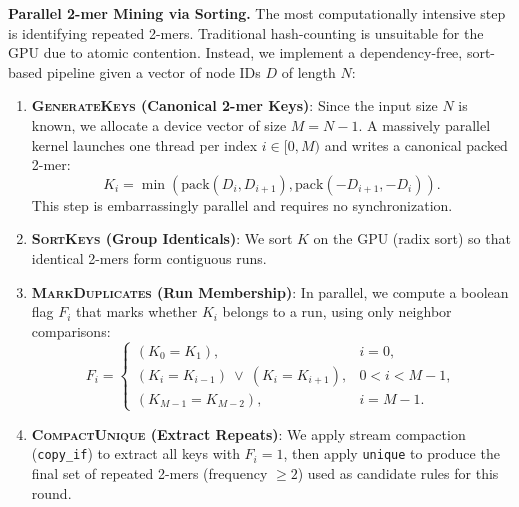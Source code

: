 \noindent \textbf{Parallel 2-mer Mining via Sorting.}
The most computationally intensive step is identifying repeated 2-mers. Traditional hash-counting is unsuitable for the GPU due to atomic contention. Instead, we implement a dependency-free, sort-based pipeline given a vector of node IDs $D$ of length $N$:
\begin{enumerate}[noitemsep, topsep=2pt, leftmargin=*]
  \item \textbf{\textsc{GenerateKeys} (Canonical 2-mer Keys)}: Since the input size $N$ is known, we allocate a device vector of size $M=N-1$. A massively parallel kernel launches one thread per index $i \in [0, M)$ and writes a canonical packed 2-mer:
        \[
          K_i = \min(\text{pack}(D_i, D_{i+1}), \text{pack}(-D_{i+1}, -D_i)).
        \]
        This step is embarrassingly parallel and requires no synchronization.
  \item \textbf{\textsc{SortKeys} (Group Identicals)}: We sort $K$ on the GPU (radix sort) so that identical 2-mers form contiguous runs.
  \item \textbf{\textsc{MarkDuplicates} (Run Membership)}: In parallel, we compute a boolean flag $F_i$ that marks whether $K_i$ belongs to a run, using only neighbor comparisons:
        \[
          F_i =
          \begin{cases}
            (K_0 = K_1),                             & i=0,     \\
            (K_i = K_{i-1}) \ \vee\ (K_i = K_{i+1}), & 0<i<M-1, \\
            (K_{M-1} = K_{M-2}),                     & i=M-1.
          \end{cases}
        \]
  \item \textbf{\textsc{CompactUnique} (Extract Repeats)}: We apply stream compaction (\texttt{copy\_if}) to extract all keys with $F_i=1$, then apply \texttt{unique} to produce the final set of repeated 2-mers (frequency $\ge 2$) used as candidate rules for this round.
\end{enumerate}




